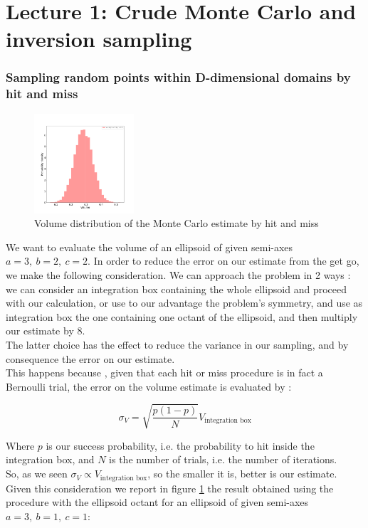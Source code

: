 \chapter*{Lecture 1: Crude Monte Carlo and inversion sampling}

\subsection*{Sampling random points within D-dimensional domains by hit and miss}

\begin{figure}
    \vspace{-25pt}
    \centering
    \includegraphics[width=0.33\textwidth]{FIG/exercise_0_images/first_ellipsoid_distribution.png}
  \caption{Volume distribution of the Monte Carlo estimate by hit and miss}
  \label{lec1:first_ellipsoid}
  \end{figure}

We want to evaluate the volume of an ellipsoid of given semi-axes $a=3,\ b=2,\ c=2$. 
In order to reduce the error on our estimate from the get go, we make the following consideration. We can approach the problem in 2 ways : 
we can consider an integration box containing the whole ellipsoid and proceed with our calculation, or use to our advantage the problem's symmetry, 
and use as integration box the one containing one octant of the ellipsoid, and then multiply our estimate by 8. \\
The latter choice has the effect to reduce the variance in our sampling, and by consequence the error on our estimate. \\
This happens because , given that each hit or miss procedure is in fact a Bernoulli trial, the error on the volume estimate is evaluated by :

$$ \sigma_V = \sqrt{\frac{p( 1-p )}{N}} V_{\text{integration box}} $$

Where $p$ is our success probability, i.e. the probability to hit inside the integration box, and $N$ is the number of trials, i.e. the number of iterations.\\
So, as we seen $\sigma_V \propto V_{\text{integration box}}$, so the smaller it is, better is our estimate. \\
Given this consideration we report in figure \ref{lec1:first_ellipsoid} the result obtained using the procedure with the ellipsoid octant for an ellipsoid of given semi-axes $a=3,\ b=1,\ c=1$:

